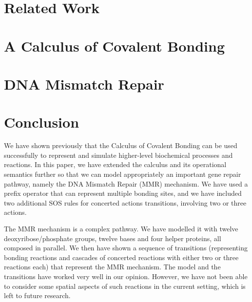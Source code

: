 \documentclass[review]{elsarticle}
\begin{document}
\section{Related Work}

%
\section{A Calculus of Covalent Bonding}\label{sec:calculus}

%
%
%
\section{DNA Mismatch Repair}\label{sec:dnamimatch}

%
\section{Conclusion}
We have shown previously that the Calculus of Covalent Bonding can be used successfully to represent and simulate higher-level biochemical processes and reactions. In this paper, we have extended the calculus and its operational semantics further so that we can model appropriately an important gene repair pathway, namely the DNA Mismatch Repair (MMR) mechanism. We have used a prefix operator that can represent 
multiple bonding sites,  and we have included two additional SOS rules for concerted actions transitions, involving two or three actions. 

The MMR mechanism is a complex pathway. We have modelled it with twelve deoxyribose/phosphate groups, twelve bases and four helper proteins, all composed in parallel. We then have shown a sequence of transitions (representing bonding reactions and cascades of concerted reactions with either two or three reactions each) that represent the MMR mechanism. The model and the transitions have worked very well in our opinion. However, we have not been able to consider some spatial aspects of such reactions in the current setting, which is left to future research.


\end{document}
